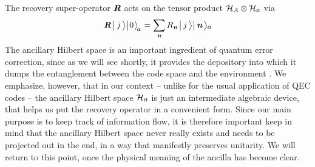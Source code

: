 \documentclass[12pt]{article}%
\def\spc{\hspace{.5pt}}
\def\be{\begin{equation}}
\def\ee{\end{equation}}
\begin{document}
The recovery super-operator ${\textit{\textbf{R}\!\,}}$  acts on the tensor product ${\cal H}_A \otimes {\cal H}_\aaaa$ via
\be
\label{superoperator}
\rR \, \bigr| \, j \, \ra \bigl| \spc 0\spc \ra_{\! \aaaa} \spc = \sum_\nomt R_\nom \, \bigl|\, j \, \ra \bigr| \, \nom \, \ra{}_{\nspc \aaaa}
\ee
 The ancillary Hilbert space is an important ingredient of quantum error correction, since as we will see shortly, 
 it provides the depository into which it dumps the entanglement  between the code space and the environment \cite{preskilllectures}. 
We emphasize, however, that in our context -- unlike for the usual application of QEC codes --
 the ancillary Hilbert space  ${\cal H}_\aaaa$ is just an intermediate algebraic device, that
 helps us put the recovery operator in a convenient form.  Since our main purpose is to keep track of information flow,
it is therefore important keep in mind that  the ancillary Hilbert space never really exists and
 needs to be projected out in the end, in a way that manifestly preserves unitarity.
 We will return to this point, once the physical meaning of the ancilla has become clear.
\end{document}
